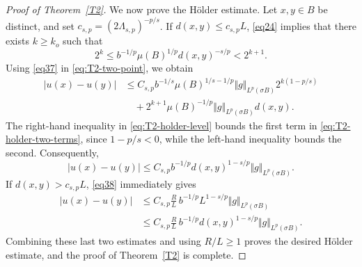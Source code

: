 \documentclass[10pt,a4paper]{amsart}
\begin{document}
\begin{proof}[Proof of Theorem~\ref{T2}]
We now prove the H\"older estimate.
Let $x,y\in B$ be distinct, and set
$c_{s,p}=(2\Lambda_{s,p})^{-p/s}$.
If $d(x,y)\leq c_{s,p}L$, \eqref{eq24} implies that there exists
$k\geq k_o$ such that
%
\begin{equation}
\label{eq:T2-holder-level}
 2^k\leq b^{-1/p}\mu(B)^{1/p}d(x,y)^{-s/p}<2^{k+1}.
\end{equation}
%
Using \eqref{eq37} in \eqref{eq:T2-two-point}, we obtain
%
\begin{equation}
\label{eq:T2-holder-two-terms}
\begin{split}
 |u(x)-u(y)|
 &\leq C_{s,p}b^{-1/s}\mu(B)^{1/s-1/p}
       \Vert g\Vert_{L^p(\sigma B)}2^{k(1-p/s)}\\
 &\quad+2^{k+1}\mu(B)^{-1/p}
       \Vert g\Vert_{L^p(\sigma B)}d(x,y).
\end{split}
\end{equation}
The right-hand inequality in \eqref{eq:T2-holder-level} bounds the
first term in \eqref{eq:T2-holder-two-terms}, since $1-p/s<0$,
while the left-hand inequality bounds the second. Consequently,
\[
 |u(x)-u(y)|
 \leq C_{s,p}b^{-1/p}d(x,y)^{1-s/p}
       \Vert g\Vert_{L^p(\sigma B)}.
\]
If $d(x,y)>c_{s,p}L$, \eqref{eq38} immediately gives
\[
\begin{split}
 |u(x)-u(y)|
 &\leq C_{s,p}\frac RL\,b^{-1/p}L^{1-s/p}
       \Vert g\Vert_{L^p(\sigma B)}\\
 &\leq C_{s,p}\frac RL\,b^{-1/p}d(x,y)^{1-s/p}
       \Vert g\Vert_{L^p(\sigma B)}.
\end{split}
\]
Combining these last two estimates and using $R/L\geq1$ proves the desired
H\"older estimate, and the proof of Theorem~\ref{T2} is complete.
\end{proof}
\end{document}
